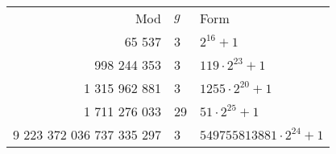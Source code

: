 \begin{tabular}{rll}
    Mod & $g$ & Form \\
    65 537 & 3 & $2^{16}+1$ \\
    998 244 353 & 3 & $119\cdot 2^{23} + 1$ \\
    1 315 962 881 & 3 & $1255\cdot 2^{20} + 1$ \\
    1 711 276 033 & 29 & $51\cdot 2^{25} + 1$ \\
    9 223 372 036 737 335 297 & 3 & $549755813881\cdot 2^{24} + 1$ \\
\end{tabular}